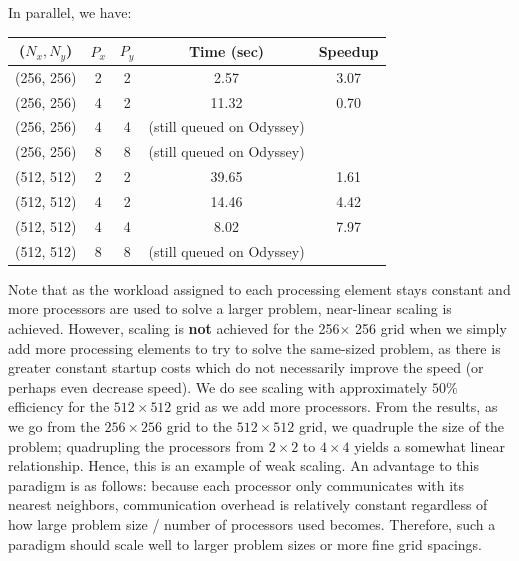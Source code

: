 \documentclass[letterpaper,12pt]{article}
\begin{document}
In parallel, we have:

\begin{center}
\begin{tabular}{|c|c|c|c|c|} \hline
($N_x, N_y$) & $P_x$ & $P_y$ & Time (sec) & Speedup \\ \hline
(256, 256) & 2 & 2 & 2.57 & 3.07\\ \hline %
(256, 256) & 4 & 2 & 11.32 & 0.70\\ \hline %
(256, 256) & 4 & 4 & (still queued on Odyssey) & \\ \hline %
(256, 256) & 8 & 8 & (still queued on Odyssey)& \\ \hline %
(512, 512) & 2 & 2 & 39.65 & 1.61\\ \hline %
(512, 512) & 4 & 2 & 14.46 & 4.42\\ \hline %
(512, 512) & 4 & 4 & 8.02 & 7.97\\ \hline 
(512, 512) & 8 & 8 & (still queued on Odyssey)&\\ \hline 
\end{tabular}
\end{center}

Note that as the workload assigned to each processing element stays constant and more processors are used to solve a larger problem, near-linear scaling is achieved. However, scaling is \textbf{not} achieved for the 256$\times$ 256 grid when we simply add more processing elements to try to solve the same-sized problem, as there is greater constant startup costs which do not necessarily improve the speed (or perhaps even decrease speed). We do see scaling with approximately $50\%$ efficiency for the $512\times 512$ grid as we add more processors. From the results, as we go from the $256\times256$ grid to the $512\times 512$ grid, we quadruple the size of the problem; quadrupling the processors from $2\times 2$ to $4\times4$ yields a somewhat linear relationship. Hence, this is an example of weak scaling. An advantage to this paradigm is as follows: because each processor only communicates with its nearest neighbors, communication overhead is relatively constant regardless of how large problem size / number of processors used becomes. Therefore, such a paradigm should scale well to larger problem sizes or more fine grid spacings. 
\end{document}
